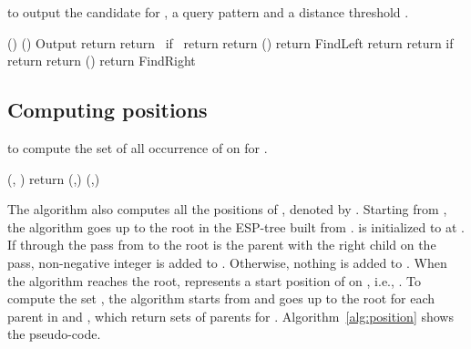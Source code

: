 \documentclass[12pt,a4paper]{scrartcl}
\begin{document}
\begin{algorithm}
  \caption{ to output the candidate  for ,
    a query pattern  and a distance threshold .  }
\label{alg:search}
{\footnotesize 
\begin{algorithmic}[1]
\For{}
\State  {}
() 
() 
\State Output 
\EndIf
\EndFor
\EndFunction
{}
\If{}
\State return 
\ElsIf{}
\State return 
\ElsIf{}
\State ~\mbox{if }
\State 
\State return 
\ElsIf{}
\State 
\State 
\State return 
\EndIf
{}()
\If{}
\State return {\sc FindLeft}
\EndIf
\EndFunction
{}
\If{}
\State return 
\ElsIf{}
\State return 
\ElsIf{}
\State  \mbox{if }
\State 
\State return 
\ElsIf{}
\State 
\State 
\State return 
\EndIf
{}()
\If{}
\State return {\sc FindRight}
\EndIf
\EndFunction
\end{algorithmic}
}
\end{algorithm}

\subsection{Computing positions}

\begin{algorithm}
\caption{ to compute the set  of all occurrence of  on  for . 
}
\label{alg:position}
{\footnotesize 
\begin{algorithmic}[1]
\State  {}
(, )
\EndFunction
{}
\State 
\State return
\EndIf
{} 
(,)
\EndFor
{} 
(,)
\EndFor
\EndFunction
\end{algorithmic}
}
\end{algorithm}

The algorithm also computes all the positions of , denoted by
.  Starting from
, the algorithm goes up to the root in the ESP-tree built from .  
is initialized to  at .  If  through the pass from  to the
root is the parent with the right child  on the pass, non-negative
integer  is added to .  Otherwise, nothing is
added to .  When the algorithm reaches the root,  represents a start
position of  on , i.e., .  To
compute the set , the algorithm starts from  and goes up to the
root for each parent in  and
, which return sets of parents for .
Algorithm~\ref{alg:position} shows the pseudo-code.
\end{document}
